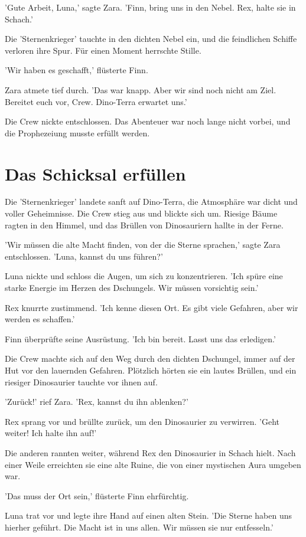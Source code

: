 \documentclass[12pt]{article}
\begin{document}
'Gute Arbeit, Luna,' sagte Zara. 'Finn, bring uns in den Nebel. Rex, halte sie in Schach.'

Die 'Sternenkrieger' tauchte in den dichten Nebel ein, und die feindlichen Schiffe verloren ihre Spur. Für einen Moment herrschte Stille.

'Wir haben es geschafft,' flüsterte Finn.

Zara atmete tief durch. 'Das war knapp. Aber wir sind noch nicht am Ziel. Bereitet euch vor, Crew. Dino-Terra erwartet uns.'

Die Crew nickte entschlossen. Das Abenteuer war noch lange nicht vorbei, und die Prophezeiung musste erfüllt werden.

\section{ Das Schicksal erfüllen }
 Die 'Sternenkrieger' landete sanft auf Dino-Terra, die Atmosphäre war dicht und voller Geheimnisse. Die Crew stieg aus und blickte sich um. Riesige Bäume ragten in den Himmel, und das Brüllen von Dinosauriern hallte in der Ferne.

'Wir müssen die alte Macht finden, von der die Sterne sprachen,' sagte Zara entschlossen. 'Luna, kannst du uns führen?'

Luna nickte und schloss die Augen, um sich zu konzentrieren. 'Ich spüre eine starke Energie im Herzen des Dschungels. Wir müssen vorsichtig sein.'

Rex knurrte zustimmend. 'Ich kenne diesen Ort. Es gibt viele Gefahren, aber wir werden es schaffen.'

Finn überprüfte seine Ausrüstung. 'Ich bin bereit. Lasst uns das erledigen.'

Die Crew machte sich auf den Weg durch den dichten Dschungel, immer auf der Hut vor den lauernden Gefahren. Plötzlich hörten sie ein lautes Brüllen, und ein riesiger Dinosaurier tauchte vor ihnen auf.

'Zurück!' rief Zara. 'Rex, kannst du ihn ablenken?'

Rex sprang vor und brüllte zurück, um den Dinosaurier zu verwirren. 'Geht weiter! Ich halte ihn auf!'

Die anderen rannten weiter, während Rex den Dinosaurier in Schach hielt. Nach einer Weile erreichten sie eine alte Ruine, die von einer mystischen Aura umgeben war.

'Das muss der Ort sein,' flüsterte Finn ehrfürchtig.

Luna trat vor und legte ihre Hand auf einen alten Stein. 'Die Sterne haben uns hierher geführt. Die Macht ist in uns allen. Wir müssen sie nur entfesseln.'
\end{document}
